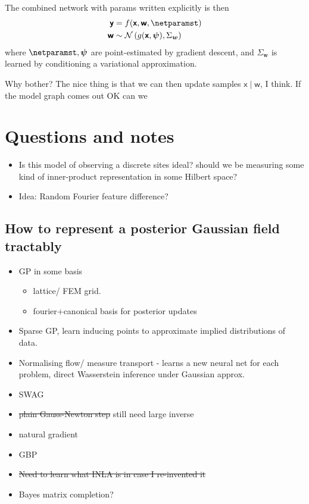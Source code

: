 \documentclass{article}
\newcommand{\vv}[1]{\boldsymbol{#1}}
\newcommand{\rv}[1]{\mathsf{#1}}
\newcommand{\vrv}[1]{\vv{\rv{#1}}}
\newcommand{\dist}[1]{\mathcal{#1}}
\newcommand{\gvn}{\mid}
\begin{document}
The combined network with params written explicitly is then
\begin{align*}
    \vrv{y} &=f(\vrv{x}, \vrv{w}, \netparamst) \\
    \vrv{w} & \sim \dist{N}\left(g(\vrv{x}, \vv{\psi}), \Sigma_{\vv{w}}\right)
\end{align*}
where \(\netparamst, \vv{\psi} \) are point-estimated by gradient descent, and \(\Sigma_{\vv{w}}\) is learned by conditioning a variational approximation.

Why bother?
The nice thing is that we can then update samples \(\vrv{x}\gvn\vrv{w}\), I think.
If the model graph comes out OK can we

\section{Questions and notes}

\begin{itemize}
    \item Is this model of observing a discrete sites ideal? should we be measuring some kind of inner-product representation in some Hilbert space?
    \item Idea: Random Fourier feature difference?
\end{itemize}

\subsection{How to represent a posterior Gaussian field tractably}

\begin{itemize}
    \item GP in some basis
    \begin{itemize}
        \item lattice/ FEM grid.
        \item fourier+canonical basis for posterior updates
    \end{itemize}
    \item Sparse GP, learn inducing points to approximate implied distributions of data.
    \item Normalising flow/ measure transport - learns a new neural net for each problem, direct Wasserstein inference under Gaussian approx.
    \item SWAG
    \item \sout{plain Gauss-Newton step} still need large inverse
    \item natural gradient
    \item GBP
    \item \sout{Need to learn what INLA is in case I re-invented it}
    \item Bayes matrix completion?
\end{itemize}
\end{document}

